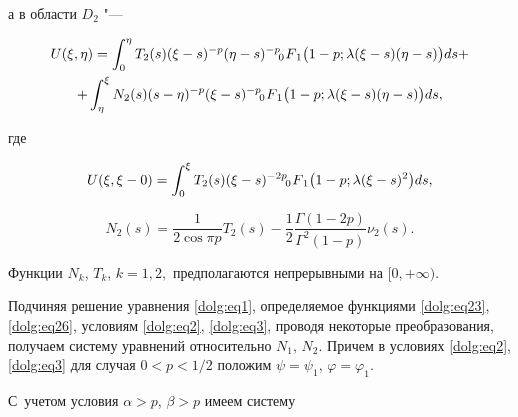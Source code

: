 а  в области $D_2$ "---

\begin{multline}

U(\xi,\eta) = \int _0^\eta T_2(s) (\xi-s)^{-p} (\eta-s)^{-p}  \,\,

F_{\hspace{-4mm}0 \hspace{3mm}1} \bigl(1-p;\lambda (\xi-s) (\eta-s)\bigr) ds +

\\

\label{dolg:eq26}

+\int ^\xi_\eta N_2(s) (s-\eta)^{-p} (\xi-s)^{-p}  \,\,

F_{\hspace{-4mm}0 \hspace{3mm}1} \bigl(1-p;\lambda (\xi-s) (\eta-s)\bigr) ds,

\end{multline}

где

\begin{equation}\label{dolg:eq27}

U(\xi,\xi-0) = \int _0^\xi T_2(s) (\xi-s)^{-2p}   \,\,

F_{\hspace{-4mm}0 \hspace{3mm}1} \bigl(1-p;\lambda (\xi-s)^2\bigr) ds,

\end{equation}

\begin{equation}\label{dolg:eq28}

N_2(s) = \frac{1}{2\cos\pi p} T_2(s) - \frac{1}{2} \frac{\Gamma(1-2p)}{\Gamma^2(1-p)} \nu_2(s).

\end{equation}

Функции $N_k$, $T_k$, $k=1, 2,$ предполагаются непрерывными на $[0,+\infty)$. 



Подчиняя решение уравнения  \eqref{dolg:eq1}, определяемое функциями \eqref{dolg:eq23}, \eqref{dolg:eq26}, условиям \eqref{dolg:eq2}, \eqref{dolg:eq3}, проводя некоторые преобразования, получаем систему уравнений относительно $N_1$, $N_2$. Причем в условиях \eqref{dolg:eq2}, \eqref{dolg:eq3} для случая $0<p<{1}/{2}$ положим $\psi=\psi_1$, $\varphi=\varphi_1$. 

С~учетом условия $\alpha>p$, $\beta>p$ имеем систему

